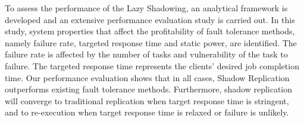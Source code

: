To assess the performance of the Lazy Shadowing, an analytical framework is developed and 
an extensive performance evaluation study is carried out. 
In this study, system properties that affect the
profitability of fault tolerance methods, namely failure rate,
targeted response time and static power, are identified. The failure rate is
affected by the number of tasks and vulnerability of the task
to failure. The targeted response time represents the 
clients' desired job completion time.  
Our performance evaluation shows that in all cases, Shadow Replication outperforms
existing fault tolerance methods. Furthermore, shadow
replication will converge to traditional replication when target response time is stringent, and to re-execution when target response time is relaxed or failure is unlikely.


   




